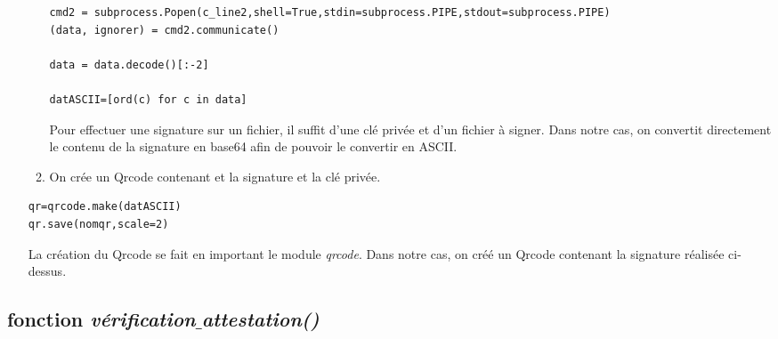 \documentclass[12pt]{article}
\newcommand{\1}{\mathbbm{1}}
\begin{document}
\begin{enumerate}[label=(\arabic*)]
\begin{enumerate}[label=(\roman*)]
\begin{lstlisting}
cmd2 = subprocess.Popen(c_line2,shell=True,stdin=subprocess.PIPE,stdout=subprocess.PIPE)
(data, ignorer) = cmd2.communicate()	

data = data.decode()[:-2]

datASCII=[ord(c) for c in data]
\end{lstlisting}
\vspace*{7mm}
Pour effectuer une signature sur un fichier, il suffit d'une clé privée et d'un fichier à signer. Dans notre cas, on convertit directement le contenu de la signature en base64 afin de pouvoir le convertir en ASCII.

\item On crée un Qrcode contenant et la signature et la clé privée.
\end{enumerate}

\begin{lstlisting}
qr=qrcode.make(datASCII)
qr.save(nomqr,scale=2)
\end{lstlisting}	
\vspace*{7mm}
La création du Qrcode se fait en important le module \textit{qrcode}. Dans notre cas, on créé un Qrcode contenant la signature réalisée ci-dessus. 
	
\end{enumerate}

	
\subsection{fonction \textit{vérification$\_$attestation()}}
\end{document}
